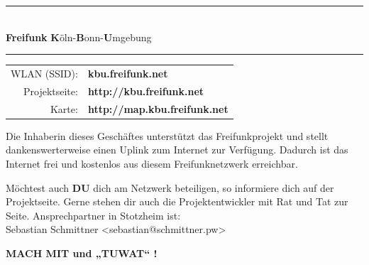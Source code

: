 \documentclass[a4paper,18pt]{scrartcl}
\begin{document}
\begin{center}
\textcolor{ff-gelb}{
\rule{\textwidth}{0.5cm} 
}\\[-0.5cm]
%
\huge \textbf{Freifunk}
\hspace{2cm}
\hspace{2cm}
\textbf{K}öln-\textbf{B}onn-\textbf{U}mgebung

\textcolor{ff-magenta}{
\rule{\textwidth}{0.5cm} 
}
\end{center}

\vspace{-1cm}

\begin{minipage}{0.55\textwidth}
\begin{tabular}{rl}
WLAN (SSID):& \textbf{kbu.freifunk.net}\\
Projektseite:& \textbf{http://kbu.freifunk.net}\\
Karte:& \textbf{http://map.kbu.freifunk.net}
\end{tabular}

\bigskip

Die Inhaberin dieses Geschäftes unterstützt das Freifunkprojekt und stellt dankenswerterweise einen Uplink zum Internet zur Verfügung.
Dadurch ist das Internet frei und kostenlos aus diesem
Freifunknetzwerk erreichbar.

Möchtest auch \textbf{DU} dich am Netzwerk beteiligen, so informiere
dich auf der Projektseite. Gerne stehen dir auch die Projektentwickler
mit Rat und Tat zur Seite. Ansprechpartner in Stotzheim ist: \\
Sebastian Schmittner <sebastian@schmittner.pw>

\bigskip

\textbf{MACH MIT und „TUWAT“ !}

\end{minipage}
%
\hfill{}
%
\end{document}

